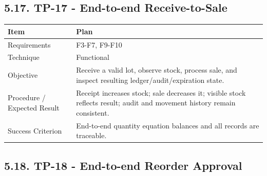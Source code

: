 \subsection{5.17. TP-17 - End-to-end Receive-to-Sale}\label{tp-17---end-to-end-receive-to-sale}

{\def\LTcaptype{none} %
\begin{longtable}[]{|
  >{\raggedright\arraybackslash}m{}|
  >{\raggedright\arraybackslash}m{}|}
\hline
\begin{minipage}[c]{\linewidth}\raggedright
\textbf{Item}
\end{minipage} & \begin{minipage}[c]{\linewidth}\raggedright
\textbf{Plan}
\end{minipage} \\
\hline
\endhead

\endlastfoot
Requirements & F3-F7, F9-F10 \\ \hline
Technique & Functional \\ \hline
Objective & Receive a valid lot, observe stock, process sale, and inspect resulting ledger/audit/expiration state. \\ \hline
Procedure / Expected Result & Receipt increases stock; sale decreases it; visible stock reflects result; audit and movement history remain consistent. \\ \hline
Success Criterion & End-to-end quantity equation balances and all records are traceable. \\ \hline
\end{longtable}
}

\subsection{5.18. TP-18 - End-to-end Reorder Approval}\label{tp-18---end-to-end-reorder-approval}


